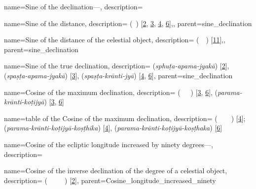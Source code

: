 {
        name={Sine of the declination---},
        description={\phantom{x}\nopagebreak}
}

{
        name={Sine of the distance},
        description={ (\jayb\idafaconsonant\ \bud) [\hyperlink{PEpass2}{2}, \hyperlink{PEpass3}{3}, \hyperlink{PEpass4}{4}, \hyperlink{PEpass6}{6}],},
        parent={sine_declination}
}

{
        name={Sine of the distance of the celestial object},
        description={ (\jayb\idafaconsonant\ \bud\idafaconsonant\ \kawkab) [\hyperlink{PEpass11}{11}],},
        parent={sine_declination}
}

{
        name={Sine of the true declination},
        description={ (\textit{sphuṭa-apama-jyakā}) [\hyperlink{SEpass2}{2}], 
                     (\textit{spaṣṭa-apama-jyakā}) [\hyperlink{SEpass3}{3}], 
                     (\textit{spaṣṭa-krānti-jyā}) [\hyperlink{SEpass4}{4}, \hyperlink{SEpass6}{6}]},
        parent={sine_declination}
}

{
        name={Cosine of the maximum declination},
        description={ (\jayb\idafaconsonant\ \tamam\idafaconsonant\ \mayl\idafaconsonant\ \kulli) [\hyperlink{PEpass3}{3}, \hyperlink{PEpass6}{6}],
         (\textit{parama-krānti-koṭijyā}) [\hyperlink{SEpass3}{3}, \hyperlink{SEpass6}{6}]}
} 

{
        name={table of the Cosine of the maximum declination},
        description={\mbox{}  (\jadval\idafaconsonant\ \jayb\idafaconsonant\ \tamam\idafaconsonant\ \mayl\idafaconsonant\ \kulli) [\hyperlink{PEpass4}{4}];
         (\textit{parama-krānti-koṭijyā-koṣṭhika}) [\hyperlink{SEpass4}{4}],  (\textit{parama-krānti-koṭijyā-koṣṭhaka}) [\hyperlink{SEpass6}{6}]}
} 


{
        name={Cosine of the ecliptic longitude increased by ninety degrees---},
        description={\phantom{x}\nopagebreak}
}

{
        name={Cosine of the inverse declination of the degree of a celestial object},
        description={\newline{}  (\jayb\idafaconsonant\ \tamam\idafaconsonant\ \mayl\idafaconsonant\ \mankus\idafaconsonant\ \daraji\idafavowel\ \kawkab) [\hyperlink{PEpass2}{2}]},
        parent={Cosine_longitude_increased_ninety}
}


